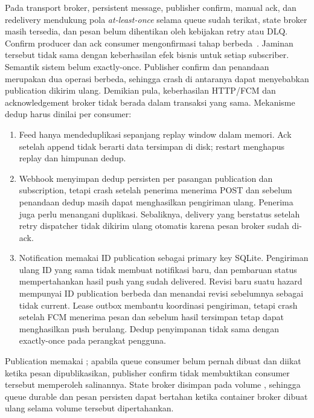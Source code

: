 Pada transport broker, persistent message, publisher confirm, manual ack,
dan redelivery mendukung pola \emph{at-least-once} selama queue sudah terikat,
state broker masih tersedia, dan pesan belum dihentikan oleh kebijakan retry
atau DLQ. Confirm producer dan ack consumer mengonfirmasi tahap berbeda~\cite{rabbit}.
Jaminan tersebut tidak sama dengan keberhasilan efek bisnis untuk setiap
subscriber. Semantik sistem belum exactly-once. Publisher confirm dan penandaan
 merupakan dua operasi berbeda, sehingga crash di
antaranya dapat menyebabkan publication dikirim ulang. Demikian pula,
keberhasilan HTTP/FCM dan acknowledgement broker tidak berada dalam
transaksi yang sama. Mekanisme dedup harus dinilai per consumer:
\begin{enumerate}
    \item Feed hanya mendeduplikasi sepanjang replay window dalam memori.
    Ack setelah append tidak berarti data tersimpan di disk; restart
    menghapus replay dan himpunan dedup.
    \item Webhook menyimpan dedup persisten per pasangan publication dan
    subscription, tetapi crash setelah penerima menerima POST dan sebelum
    penandaan dedup masih dapat menghasilkan pengiriman ulang. Penerima
    juga perlu menangani duplikasi. Sebaliknya, delivery yang berstatus
     setelah retry dispatcher tidak dikirim ulang otomatis
    karena pesan broker sudah di-ack.
    \item Notification memakai ID publication sebagai primary key SQLite.
    Pengiriman ulang ID yang sama tidak membuat notifikasi baru, dan
    pembaruan status mempertahankan hasil push yang sudah delivered.
    Revisi baru suatu hazard mempunyai ID publication berbeda dan
    menandai revisi sebelumnya sebagai tidak current. Lease outbox
    membantu koordinasi pengiriman, tetapi crash setelah FCM menerima
    pesan dan sebelum hasil tersimpan tetap dapat menghasilkan push
    berulang. Dedup penyimpanan tidak sama dengan exactly-once pada
    perangkat pengguna.
\end{enumerate}

Publication memakai ; apabila queue consumer belum
pernah dibuat dan diikat ketika pesan dipublikasikan, publisher confirm
tidak membuktikan consumer tersebut memperoleh salinannya. State broker
disimpan pada volume , sehingga queue durable dan pesan
persisten dapat bertahan ketika container broker dibuat ulang selama volume
tersebut dipertahankan.

